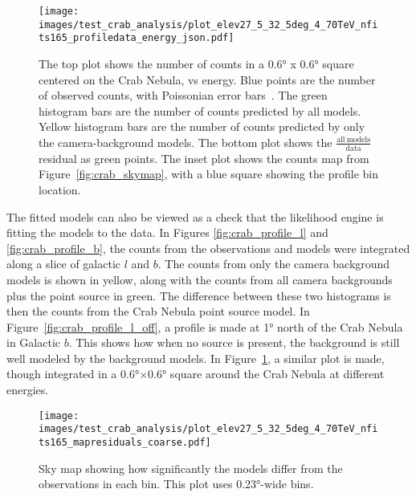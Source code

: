 \begin{figure}[p]
  \centering
  \texttt{[image: images/test\_crab\_analysis/plot\_elev27\_5\_32\_5deg\_4\_70TeV\_nfits165\_profiledata\_energy\_json.pdf]}
  \caption[Crab Nebula Profile in Energy]
  {
    The top plot shows the number of counts in a \ang{0.6} x \ang{0.6} square centered on the Crab Nebula, vs energy.
    Blue points are the number of observed counts, with Poissonian error bars~\cite{poissonfrequentistinterval}.
    The green histogram bars are the number of counts predicted by all models.
    Yellow histogram bars are the number of counts predicted by only the camera-background models.
    The bottom plot shows the $\frac{\mathrm{all\:models}}{\mathrm{data}}$ residual as green points.
    The inset plot shows the counts map from Figure~\ref{fig:crab_skymap}, with a blue square showing the profile bin location.
  }
  \label{fig:crab_profile_energy}
\end{figure}
    
The fitted models can also be viewed as a check that the likelihood engine is fitting the models to the data.
In Figures \ref{fig:crab_profile_l} and \ref{fig:crab_profile_b}, the counts from the observations and models were integrated along a slice of galactic $l$ and $b$.
The counts from only the camera background models is shown in yellow, along with the counts from all camera backgrounds plus the point source in green.
The difference between these two histograms is then the counts from the Crab Nebula point source model.
In Figure~\ref{fig:crab_profile_l_off}, a profile is made at \ang{1} north of the Crab Nebula in Galactic $b$.
This shows how when no source is present, the background is still well modeled by the background models.
In Figure~\ref{fig:crab_profile_energy}, a similar plot is made, though integrated in a \ang{0.6}$\times$\ang{0.6} square around the Crab Nebula at different energies.
  
\begin{figure}[tb]
  \centering
  \texttt{[image: images/test\_crab\_analysis/plot\_elev27\_5\_32\_5deg\_4\_70TeV\_nfits165\_mapresiduals\_coarse.pdf]}
  \caption[Crab Residual Sky Map]{
    Sky map showing how significantly the models differ from the observations in each bin.
    This plot uses \ang{0.23}-wide bins.}
  \label{fig:crab_signif_skymap_coarse}
\end{figure}
  

